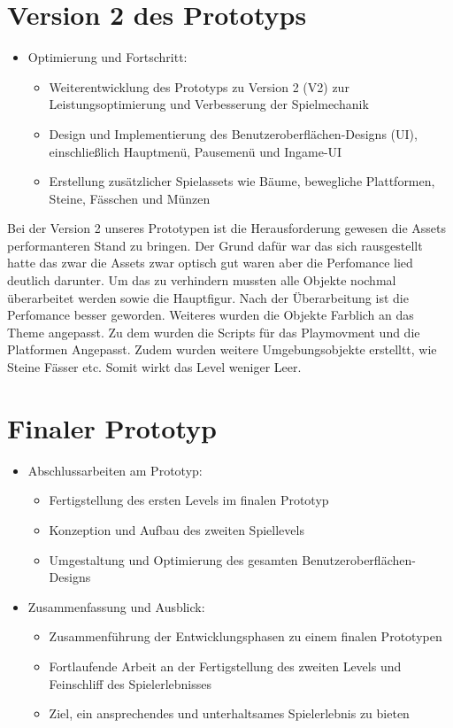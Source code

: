 \pagebreak

\section{Version 2 des Prototyps}

\begin{itemize}
  \item Optimierung und Fortschritt:
    \begin{itemize}
      \item Weiterentwicklung des Prototyps zu Version 2 (V2) zur Leistungsoptimierung und Verbesserung der Spielmechanik
      \item Design und Implementierung des Benutzeroberflächen-Designs (UI), einschließlich Hauptmenü, Pausemenü und Ingame-UI
      \item Erstellung zusätzlicher Spielassets wie Bäume, bewegliche Plattformen, Steine, Fässchen und Münzen
    \end{itemize}
\end{itemize}

Bei der Version 2 unseres Prototypen ist die Herausforderung gewesen die Assets performanteren Stand zu bringen. Der Grund dafür war das sich rausgestellt hatte das zwar die Assets zwar optisch gut waren aber die Perfomance lied deutlich darunter. Um das zu verhindern mussten alle Objekte nochmal überarbeitet werden sowie die Hauptfigur. Nach der Überarbeitung ist die Perfomance besser geworden. Weiteres wurden die Objekte Farblich an das Theme angepasst. Zu dem wurden die Scripts für das Playmovment und die Platformen Angepasst. Zudem wurden weitere Umgebungsobjekte erstelltt, wie Steine Fässer etc. Somit wirkt das Level weniger Leer. 

\pagebreak

\section{Finaler Prototyp}

\begin{itemize}
  \item Abschlussarbeiten am Prototyp:
    \begin{itemize}
      \item Fertigstellung des ersten Levels im finalen Prototyp
      \item Konzeption und Aufbau des zweiten Spiellevels
      \item Umgestaltung und Optimierung des gesamten Benutzeroberflächen-Designs
    \end{itemize}
    
  \item Zusammenfassung und Ausblick:
    \begin{itemize}
      \item Zusammenführung der Entwicklungsphasen zu einem finalen Prototypen
      \item Fortlaufende Arbeit an der Fertigstellung des zweiten Levels und Feinschliff des Spielerlebnisses
      \item Ziel, ein ansprechendes und unterhaltsames Spielerlebnis zu bieten
    \end{itemize}
\end{itemize}


